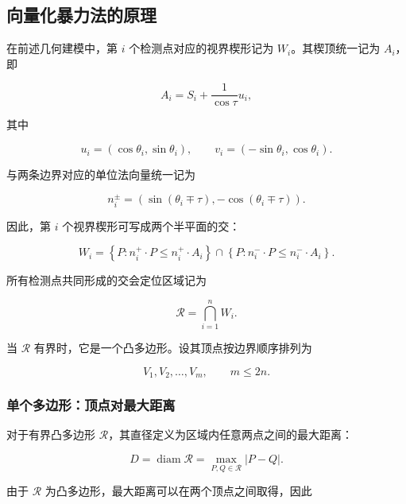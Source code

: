 \subsection{向量化暴力法的原理}

在前述几何建模中，第 $i$ 个检测点对应的视界楔形记为 $W_i$。其楔顶统一记为 $A_i$，即

\begin{equation}
A_i = S_i+\frac{1}{\cos\tau}u_i,
\end{equation}

其中

\begin{equation}
u_i=(\cos\theta_i,\sin\theta_i),
\qquad
v_i=(-\sin\theta_i,\cos\theta_i).
\end{equation}

与两条边界对应的单位法向量统一记为

\begin{equation}
n_i^\pm =
\left(
\sin(\theta_i\mp\tau),
-\cos(\theta_i\mp\tau)
\right).
\end{equation}

因此，第 $i$ 个视界楔形可写成两个半平面的交：

\begin{equation}
W_i=
\left\{
P:
n_i^+\cdot P\leq n_i^+\cdot A_i
\right\}
\cap
\left\{
P:
n_i^-\cdot P\leq n_i^-\cdot A_i
\right\}.
\end{equation}

所有检测点共同形成的交会定位区域记为

\begin{equation}
\mathcal R=\bigcap_{i=1}^{n}W_i.
\end{equation}

当 $\mathcal R$ 有界时，它是一个凸多边形。设其顶点按边界顺序排列为

$$
V_1,V_2,\ldots,V_m,
\qquad
m\leq2n.
$$

\subsubsection{单个多边形：顶点对最大距离}

对于有界凸多边形 $\mathcal R$，其直径定义为区域内任意两点之间的最大距离：

\begin{equation}
D = \operatorname{diam}\mathcal R =
\max_{P,Q\in\mathcal R}|P-Q|.
\end{equation}

由于 $\mathcal R$ 为凸多边形，最大距离可以在两个顶点之间取得，因此

